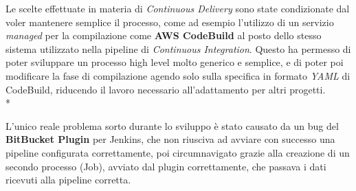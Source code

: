 \documentclass[../main.tex]{subfiles}
\begin{document}
            Le scelte effettuate in materia di \emph{Continuous Delivery} sono state condizionate dal voler mantenere semplice il processo, come ad esempio l'utilizzo di un servizio \emph{managed} per la compilazione come \textbf{AWS CodeBuild} al posto dello stesso sistema utilizzato nella pipeline di \emph{Continuous Integration}. Questo ha permesso di poter sviluppare un processo high level molto generico e semplice, e di poter poi modificare la fase di compilazione agendo solo sulla specifica in formato \emph{YAML} di CodeBuild, riducendo il lavoro necessario all'adattamento per altri progetti.\\*
            
            L'unico reale problema sorto durante lo sviluppo è stato causato da un bug del \textbf{BitBucket Plugin} per Jenkins, che non riusciva ad avviare con successo una pipeline configurata correttamente, poi circumnavigato grazie alla creazione di un secondo processo (Job), avviato dal plugin correttamente, che passava i dati ricevuti alla pipeline corretta.
\end{document}
